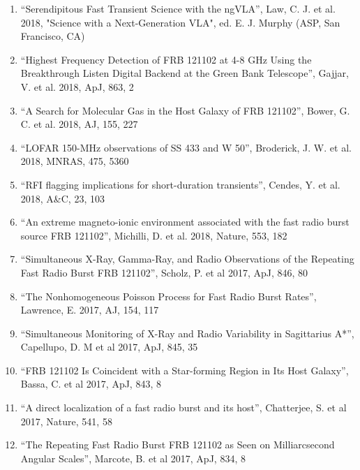 \documentclass[11pt]{article}
\begin{document}
\begin{enumerate}
	\item ``Serendipitous Fast Transient Science with the ngVLA'', Law, C. J. et al. 2018, "Science with a Next-Generation VLA", ed. E. J. Murphy (ASP, San Francisco, CA)

    \item ``Highest Frequency Detection of FRB 121102 at 4-8 GHz Using the Breakthrough Listen Digital Backend at the Green Bank Telescope'', Gajjar, V. et al. 2018, ApJ, 863, 2
    
    \item ``A Search for Molecular Gas in the Host Galaxy of FRB 121102'', Bower, G. C. et al. 2018, AJ, 155, 227
    
    \item ``LOFAR 150-MHz observations of SS 433 and W 50'', Broderick, J. W. et al. 2018, MNRAS, 475, 5360
    
    \item ``RFI flagging implications for short-duration transients'', Cendes, Y. et al. 2018, A\&C, 23, 103
    
    \item ``An extreme magneto-ionic environment associated with the fast radio burst source FRB 121102'', Michilli, D. et al. 2018, Nature, 553, 182
    
    \item ``Simultaneous X-Ray, Gamma-Ray, and Radio Observations of the Repeating Fast Radio Burst FRB 121102'', Scholz, P. et al 2017, ApJ, 846, 80
    
    \item ``The Nonhomogeneous Poisson Process for Fast Radio Burst Rates'', Lawrence, E. 2017, AJ, 154, 117
    
    \item ``Simultaneous Monitoring of X-Ray and Radio Variability in Sagittarius A*'', Capellupo, D. M et al 2017, ApJ, 845, 35
    
    \item ``FRB 121102 Is Coincident with a Star-forming Region in Its Host Galaxy'', Bassa, C. et al 2017, ApJ, 843, 8
    
    \item ``A direct localization of a fast radio burst and its host'', Chatterjee, S. et al 2017, Nature, 541, 58
    
    \item ``The Repeating Fast Radio Burst FRB 121102 as Seen on Milliarcsecond Angular Scales'', Marcote, B. et al 2017, ApJ, 834, 8


\end{enumerate}
\end{document}
